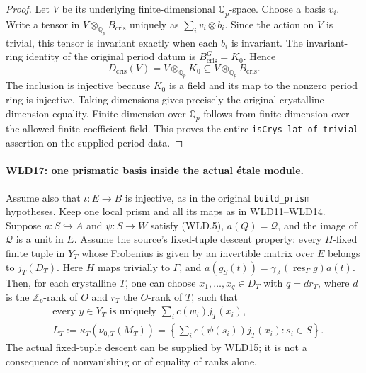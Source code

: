 \begin{proof}
Let $V$ be its underlying finite-dimensional $\mathbb Q_p$-space.
Choose a basis $v_i$. Write a tensor in
$V\otimes_{\mathbb Q_p}B_{\mathrm{cris}}$ uniquely as
$\sum_i v_i\otimes b_i$. Since the action on $V$ is trivial,
this tensor is invariant exactly when each $b_i$ is invariant.
The invariant-ring identity of the original period datum is
$B_{\mathrm{cris}}^G=K_0$. Hence
\[
            D_{\mathrm{cris}}(V)
              =V\otimes_{\mathbb Q_p}K_0
              \subseteq V\otimes_{\mathbb Q_p}B_{\mathrm{cris}}.
\]
The inclusion is injective because $K_0$ is a field and its map to
the nonzero period ring is injective. Taking dimensions gives
precisely the original crystalline dimension equality.
Finite dimension over $\mathbb Q_p$ follows from finite dimension
over the allowed finite coefficient field. This proves the entire
\texttt{is\allowbreak Crys\_\allowbreak lat\_\allowbreak of\_\allowbreak trivial} assertion on the supplied period data.
\end{proof}

\paragraph{WLD17: one prismatic basis inside the actual \'etale module.}
\label{claim:WLD17}
Assume also that $\iota:E\to B$ is injective, as in the original
\texttt{build\_prism} hypotheses.
Keep one local prism and all its maps as in WLD11--WLD14. Suppose
$a:S\hookrightarrow A$ and $\psi:S\to W$ satisfy (WLD.5),
$a(Q)=\mathcal Q$, and the image of $\mathcal Q$ is a unit in $E$.
Assume the source's fixed-tuple descent property: every $H$-fixed
finite tuple in $Y_T$ whose Frobenius is given by an invertible
matrix over $E$ belongs to $j_T(D_T)$. Here $H$ maps trivially
to $\Gamma$, and $a(g_S(t))=\gamma_A(\operatorname{res}_\Gamma g)a(t)$.
Then, for each crystalline $T$, one can choose $x_1,\ldots,x_q\in D_T$
with $q=dr_T$, where $d$ is the $\mathbb Z_p$-rank of $O$ and
$r_T$ the $O$-rank of $T$, such that
\[
 \begin{split}
 &\text{every }y\in Y_T
          \text{ is uniquely }\sum_i c(w_i)j_T(x_i),\\
 &L_T:=\kappa_T(\nu_{0,T}(M_T))
       =\left\{\sum_i c(\psi(s_i))j_T(x_i):s_i\in S\right\}.
 \end{split}                                                \tag{WLD.20}
\]
The actual fixed-tuple descent can be supplied by WLD15; it is not
a consequence of nonvanishing or of equality of ranks alone.

